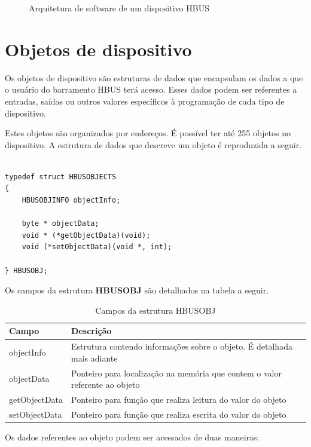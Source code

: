 \documentclass[11pt]{report}
\begin{document}
\begin{figure}[h]
\centering

\caption{Arquitetura de software de um dispositivo HBUS}
\end{figure}

\section{Objetos de dispositivo}

Os objetos de dispositivo são estruturas de dados que encapsulam os dados a que o usuário do barramento HBUS terá acesso. Esses dados podem ser referentes a entradas, saídas ou outros valores específicos à programação de cada tipo de dispositivo.

Estes objetos são organizados por endereços. É possível ter até 255 objetos no dispositivo. A estrutura de dados que descreve um objeto é reproduzida a seguir.

\begin{verbatim}

typedef struct HBUSOBJECTS
{
	HBUSOBJINFO objectInfo;
	
	byte * objectData;
	void * (*getObjectData)(void);
	void (*setObjectData)(void *, int);
	
} HBUSOBJ;

\end{verbatim}

Os campos da estrutura \textbf{HBUSOBJ} são detalhados na tabela a seguir.

\begin{table}[H]
\centering
\caption{Campos da estrutura HBUSOBJ}
\begin{tabular}{l p{12cm}}

\hline
Campo			&	Descrição\\
\hline
objectInfo		&	Estrutura contendo informações sobre o objeto. É detalhada mais adiante\\
objectData		&	Ponteiro para localização na memória que contem o valor referente ao objeto\\
getObjectData	&	Ponteiro para função que realiza leitura do valor do objeto\\
setObjectData	&	Ponteiro para função que realiza escrita do valor do objeto\\
\hline

\end{tabular}
\end{table}

Os dados referentes ao objeto podem ser acessados de duas maneiras:
\end{document}
